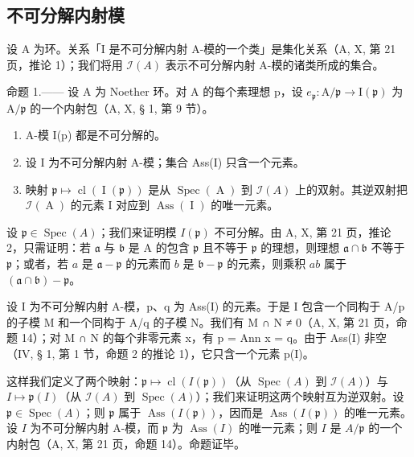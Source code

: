 \subsection{不可分解内射模}

设 A 为环。关系「I 是不可分解内射 A-模的一个类」是集化关系（A, X, 第 21 页，推论 1）；我们将用 \(\mathcal{I}(A)\) 表示不可分解内射 A-模的诸类所成的集合。

命题 1.—— 设 A 为 Noether 环。对 A 的每个素理想 p，设 \(e_{\mathfrak{p}}: \mathrm{A}/\mathfrak{p} \to \mathrm{I}(\mathfrak{p})\) 为 \(\mathrm{A}/\mathfrak{p}\) 的一个内射包（A, X, § 1, 第 9 节）。

\begin{enumerate}
\def\labelenumi{\alph{enumi})}
\item
  A-模 I(p) 都是不可分解的。
\item
  设 I 为不可分解内射 A-模；集合 Ass(I) 只含一个元素。
\item
  映射 \(\mathfrak{p} \mapsto \operatorname{cl}(\operatorname{I}(\mathfrak{p}))\) 是从 \(\operatorname{Spec}(\operatorname{A})\) 到 \(\mathcal{I}(A)\) 上的双射。其逆双射把 \(\mathcal{I}(\operatorname{A})\) 的元素 I 对应到 \(\operatorname{Ass}(\operatorname{I})\) 的唯一元素。
\end{enumerate}

设 \(\mathfrak{p} \in \operatorname{Spec}(A)\)；我们来证明模 \(I(\mathfrak{p})\) 不可分解。由 A, X, 第 21 页，推论 2，只需证明：若 \(\mathfrak{a}\) 与 \(\mathfrak{b}\) 是 A 的包含 \(\mathfrak{p}\) 且不等于 \(\mathfrak{p}\) 的理想，则理想 \(\mathfrak{a} \cap \mathfrak{b}\) 不等于 \(\mathfrak{p}\)；或者，若 \(a\) 是 \(\mathfrak{a} - \mathfrak{p}\) 的元素而 \(b\) 是 \(\mathfrak{b} - \mathfrak{p}\) 的元素，则乘积 \(ab\) 属于 \((\mathfrak{a} \cap \mathfrak{b}) - \mathfrak{p}\)。

设 I 为不可分解内射 A-模，p、q 为 Ass(I) 的元素。于是 I 包含一个同构于 A/p 的子模 M 和一个同构于 A/q 的子模 N。我们有 M ∩ N ≠ 0（A, X, 第 21 页，命题 14）；对 M ∩ N 的每个非零元素 x，有 p = Ann x = q。由于 Ass(I) 非空（IV, § 1, 第 1 节，命题 2 的推论 1），它只含一个元素 p(I)。

这样我们定义了两个映射：\(\mathfrak{p} \mapsto \operatorname{cl}(I(\mathfrak{p}))\)（从 \(\operatorname{Spec}(A)\) 到 \(\mathcal{I}(A)\)）与 \(I \mapsto \mathfrak{p}(I)\)（从 \(\mathcal{I}(A)\) 到 \(\operatorname{Spec}(A)\)）；我们来证明这两个映射互为逆双射。设 \(\mathfrak{p} \in \operatorname{Spec}(A)\)；则 \(\mathfrak{p}\) 属于 \(\operatorname{Ass}(I(\mathfrak{p}))\)，因而是 \(\operatorname{Ass}(I(\mathfrak{p}))\) 的唯一元素。设 \(I\) 为不可分解内射 A-模，而 \(\mathfrak{p}\) 为 \(\operatorname{Ass}(I)\) 的唯一元素；则 \(I\) 是 \(A/\mathfrak{p}\) 的一个内射包（A, X, 第 21 页，命题 14）。命题证毕。

